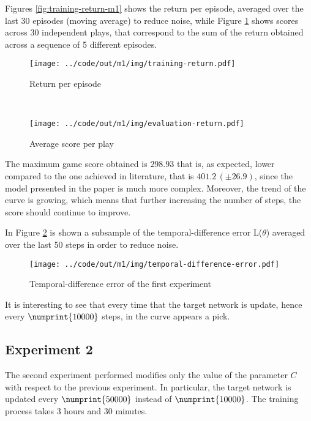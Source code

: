 \documentclass[a4paper,12pt]{article} %
\begin{document}
	Figures \ref{fig:training-return-m1} shows the return per episode, averaged over the last 30 episodes (moving average) to reduce noise, while Figure \ref{fig:evaluation-return-m1} shows scores across 30 independent plays, that correspond to the sum of the return obtained across a sequence of 5 different episodes.
	
	\begin{figure}[htb]
		\begin{minipage}[b]{.49\textwidth}
			\centering
			\texttt{[image: ../code/out/m1/img/training-return.pdf]}	
			\caption{Return per episode}
			\label{fig:training-return-m1}
		\end{minipage}
		~
		\begin{minipage}[b]{.49\textwidth}
			\centering
			\texttt{[image: ../code/out/m1/img/evaluation-return.pdf]}	
			\caption{Average score per play}
			\label{fig:evaluation-return-m1}
		\end{minipage}
	\end{figure}

	The maximum game score obtained is $298.93$ that is, as expected, lower compared to the one achieved in literature, that is $401.2 \, (\pm 26.9)$, since the model presented in the paper is much more complex.
	Moreover, the trend of the curve is growing, which means that further increasing the number of steps, the score should continue to improve.
	\bigskip
		
	In Figure \ref{fig:loss-m1} is shown a subsample of the temporal-difference error L($\theta$) averaged over the last 50 steps in order to reduce noise.
	
	\begin{figure}[htb]
		\centering
		\texttt{[image: ../code/out/m1/img/temporal-difference-error.pdf]}	
		\caption{Temporal-difference error of the first experiment}
		\label{fig:loss-m1}
	\end{figure} 
	It is interesting to see that every time that the target network is update, hence every $\numprint{10000}$ steps, in the curve appears a pick.

	\subsection*{Experiment 2}
	The second experiment performed modifies only the value of the parameter $C$ with respect to the previous experiment. In particular, the target network is updated every $\numprint{50000}$ instead of $\numprint{10000}$. The training process takes 3 hours and 30 minutes. 
	\bigskip
	
\end{document}
